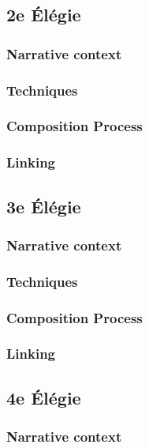 \documentclass[12pt,twoside,maitrise]{dms}
\theoremstyle{definition}
\numberwithin{equation}{section}
\numberwithin{table}{chapter}
\numberwithin{figure}{chapter}
\begin{document}
\subsection{2e Élégie}

\subsubsection{Narrative context}

\subsubsection{Techniques}

\subsubsection{Composition Process}

\subsubsection{Linking}

\subsection{3e Élégie}

\subsubsection{Narrative context}

\subsubsection{Techniques}

\subsubsection{Composition Process}

\subsubsection{Linking}

\subsection{4e Élégie}

\subsubsection{Narrative context}
\end{document}
